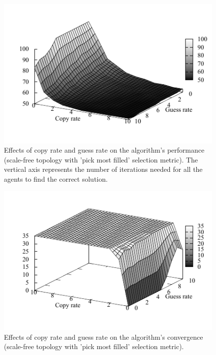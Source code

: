 \documentclass{article}
\begin{document}
\begin{figure}
\includegraphics[scale=1]{ijcai_sudoku/fill_iter}
\caption{Effects of copy rate and guess rate on the algorithm's performance (scale-free topology with 'pick most filled' selection metric). The vertical axis represents the number of iterations needed for all the agents to find the correct solution.
}
\label{fig:copy_guess_free_most}
\end{figure}

\begin{figure}
\includegraphics[scale=1]{ijcai_sudoku/fill_suc}
\caption{Effects of copy rate and guess rate on the algorithm's convergence (scale-free topology with 'pick most filled' selection metric).
}
\label{fig:copy_guess_free_most}
\end{figure}
\end{document}
